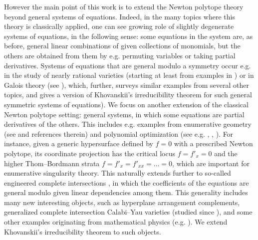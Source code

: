 However the main point of this work is to extend the Newton polytope theory beyond general systems of equations. Indeed, in the many topics where this theory is classically applied, one can see growing role of slightly degenerate systems of equations, in the following sense: some equations in the system are, as before, general linear combinations of given collections of monomials, but the others are obtained from them by e.g. permuting variables or taking partial derivatives. Systems of equations that are general modulo a symmetry occur e.g. in the study of nearly rational varieties (starting at least from examples in \cite{Bayle1994}) or in Galois theory (see \cite{Esterov2022}), which, further, surveys similar examples from several other topics, and gives a version of Khovanskii's irreducibility theorem for such general symmetric systems of equations).
We focus on another extension of the classical Newton polytope setting: general systems, in which some equations are partial derivatives of the others. This includes e.g. examples from enumerative geometry (see \cite{Esterov2013} and references therein) and polynomial optimization (see e.g. \cite{DHOBT}, \cite{BSW}, \cite{LNRW}). For instance, given a generic hypersurface defined by $f = 0$ with a prescribed Newton polytope, its coordinate projection has the critical locus $f = f'_x = 0$ and the higher Thom--Bordmann strata $f = f'_x = f'_{xx} = \dots =0$, which are important for enumerative singularity theory. This naturally extends further to so-called engineered complete intersections \cite{Esterov2024}, in which the coefficients of the equations are general modulo given linear dependencies among them. This generality includes many new interesting objects, such as hyperplane arrangement complements, generalized complete intersection Calabi--Yau varieties (studied since \cite{AAGGL}), and some other examples originating from mathematical physics (e.g. \cite{BMMT}). We extend Khovanskii's irreducibility theorem to such objects.

